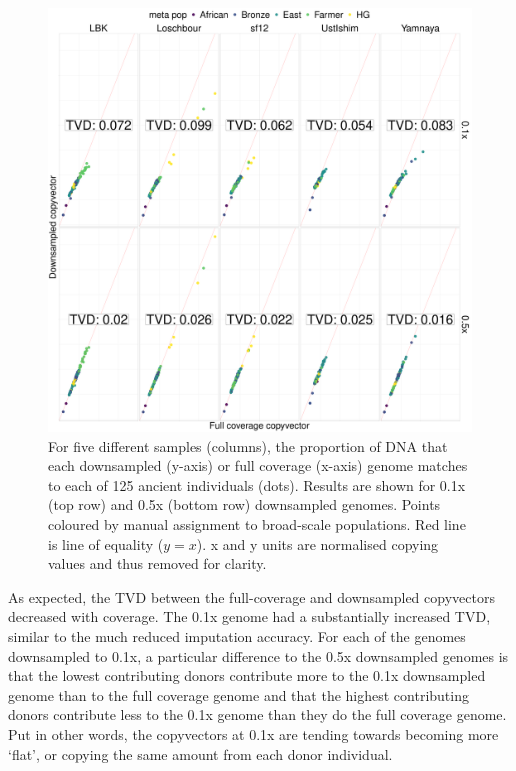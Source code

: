 {\begin{figure}[htp]
    \centering
    \includegraphics[width=1.0\textwidth]{../images/chapter1/CP_correlation_allSamples_0.1x_0.5x_30x.pdf}
    \caption{For five different samples (columns), the proportion of DNA that each downsampled (y-axis) or full coverage (x-axis) genome matches to each of 125 ancient individuals (dots). Results are shown for 0.1x (top row) and 0.5x (bottom row) downsampled genomes. Points coloured by manual assignment to broad-scale populations. Red line is line of equality ($y=x$). x and y units are normalised copying values and thus removed for clarity.}
    \label{fig:CP_correlation_allSamples_0.1x_0.5x_30x}
\end{figure}

As expected, the TVD between the full-coverage and downsampled copyvectors decreased with coverage. The 0.1x genome had a substantially increased TVD, similar to the much reduced imputation accuracy. For each of the genomes downsampled to 0.1x, a particular difference to the 0.5x downsampled genomes is that the lowest contributing donors contribute more to the 0.1x downsampled genome than to the full coverage genome and that the highest contributing donors contribute less to the 0.1x genome than they do the full coverage genome. Put in other words, the copyvectors at 0.1x are tending towards becoming more `flat', or copying the same amount from each donor individual. 

}
